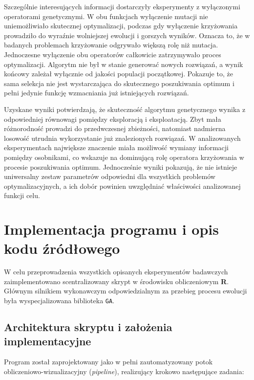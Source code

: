 \documentclass[a4paper,12pt]{article}
\begin{document}
Szczególnie interesujących informacji dostarczyły eksperymenty z wyłączonymi operatorami genetycznymi. W obu funkcjach wyłączenie mutacji nie uniemożliwiało skutecznej optymalizacji, podczas gdy wyłączenie krzyżowania prowadziło do wyraźnie wolniejszej ewolucji i gorszych wyników. Oznacza to, że w badanych problemach krzyżowanie odgrywało większą rolę niż mutacja. Jednoczesne wyłączenie obu operatorów całkowicie zatrzymywało proces optymalizacji. Algorytm nie był w stanie generować nowych rozwiązań, a wynik końcowy zależał wyłącznie od jakości populacji początkowej. Pokazuje to, że sama selekcja nie jest wystarczająca do skutecznego poszukiwania optimum i pełni jedynie funkcję wzmacniania już istniejących rozwiązań.

Uzyskane wyniki potwierdzają, że skuteczność algorytmu genetycznego wynika z odpowiedniej równowagi pomiędzy eksploracją i eksploatacją. Zbyt mała różnorodność prowadzi do przedwczesnej zbieżności, natomiast nadmierna losowość utrudnia wykorzystanie już znalezionych rozwiązań. W analizowanych eksperymentach największe znaczenie miała możliwość wymiany informacji pomiędzy osobnikami, co wskazuje na dominującą rolę operatora krzyżowania w procesie poszukiwania optimum. Jednocześnie wyniki pokazują, że nie istnieje uniwersalny zestaw parametrów odpowiedni dla wszystkich problemów optymalizacyjnych, a ich dobór powinien uwzględniać właściwości analizowanej funkcji celu.

\section{Implementacja programu i opis kodu źródłowego}

W celu przeprowadzenia wszystkich opisanych eksperymentów badawczych zaimplementowano scentralizowany skrypt w środowisku obliczeniowym \textbf{R}. Głównym silnikiem wykonawczym odpowiedzialnym za przebieg procesu ewolucji była wyspecjalizowana biblioteka \texttt{GA}.

\subsection{Architektura skryptu i założenia implementacyjne}
Program został zaprojektowany jako w pełni zautomatyzowany potok obliczeniowo-wizualizacyjny (\textit{pipeline}), realizujący krokowo następujące zadania:
\end{document}
